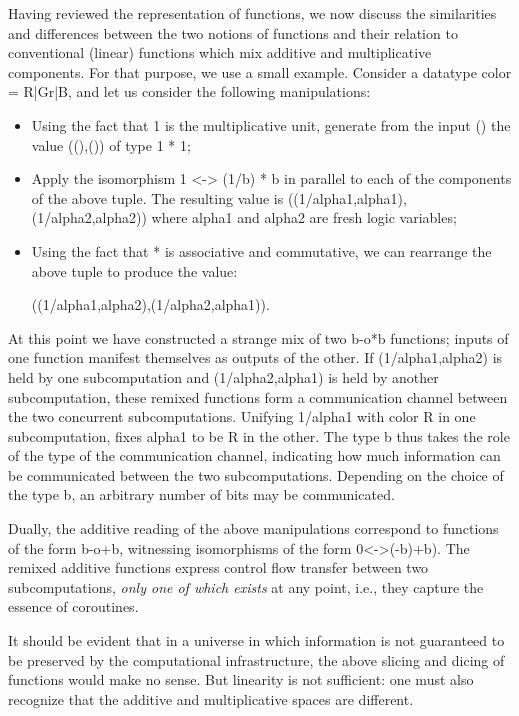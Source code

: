 \documentclass[preprint]{sigplanconf}
\begin{document}
Having reviewed the representation of functions, we now discuss the
similarities and differences between the two notions of functions and their
relation to conventional (linear) functions which mix additive and
multiplicative components. For that purpose, we use a small example.
Consider a datatype {{color = R|Gr|B}}, and let us consider the following
manipulations:
\begin{itemize}
\item Using the fact that {{1}} is the multiplicative unit, generate
  from the input {{()}} the value {{((),())}} of type {{1 * 1}};
\item Apply the isomorphism {{1 <-> (1/b) * b}} in parallel to each of
  the components of the above tuple. The resulting value is
  {{((1/alpha1,alpha1),(1/alpha2,alpha2))}} where {{alpha1}} and
  {{alpha2}} are fresh logic variables;
\item Using the fact that {{*}} is associative and commutative, we can
  rearrange the above tuple to produce the value:

{{((1/alpha1,alpha2),(1/alpha2,alpha1))}}.

\end{itemize}

At this point we have constructed a strange mix of two {{b-o*b}} functions;
inputs of one function manifest themselves as outputs of the other. If
{{(1/alpha1,alpha2)}} is held by one subcomputation and {{(1/alpha2,alpha1)}}
is held by another subcomputation, these remixed functions form a
communication channel between the two concurrent subcomputations. Unifying
{{1/alpha1}} with {{color}} {{R}} in one subcomputation, fixes {{alpha1}} to
be {{R}} in the other. The type {{b}} thus takes the role of the type of the
communication channel, indicating how much information can be communicated
between the two subcomputations.  Depending on the choice of the type {{b}},
an arbitrary number of bits may be communicated.

Dually, the additive reading of the above manipulations correspond to
functions of the form {{b-o+b}}, witnessing isomorphisms of the form
{{0<->(-b)+b}}). The remixed additive functions express control flow transfer
between two subcomputations, \emph{only one of which exists} at any point,
i.e., they capture the essence of coroutines. 

It should be evident that in a universe in which information is not
guaranteed to be preserved by the computational infrastructure, the above
slicing and dicing of functions would make no sense. But linearity is not
sufficient: one must also recognize that the additive and multiplicative
spaces are different. 
\end{document}
